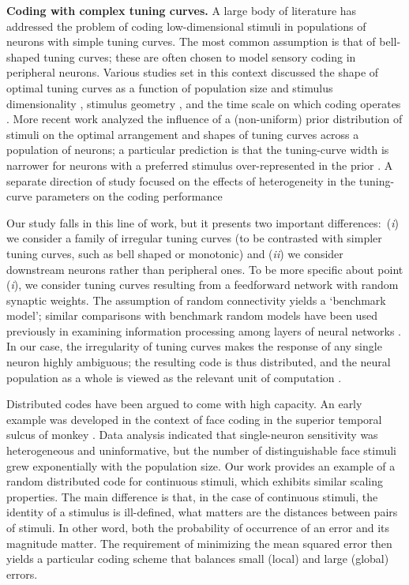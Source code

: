 \documentclass[a4paper]{article}%
\begin{document}
\textbf{Coding with complex tuning curves.} A large body of literature has
addressed the problem of coding low-dimensional stimuli in populations of
neurons with simple tuning curves. The most common assumption is that of
bell-shaped tuning curves; these are often chosen to model sensory coding in
peripheral neurons. Various studies set in this context discussed the shape of
optimal tuning curves as a function of population size and stimulus
dimensionality \cite[]{Zhang1999NeuronalBroaden}, stimulus geometry
\cite[]{Montemurro2006OptimalVariables}, and the time scale on which coding
operates \cite[]{Bethge2002OptimalFails,Yaeli2010Error-basedNeurons}. More
recent work analyzed the influence of a (non-uniform) prior distribution of
stimuli on the optimal arrangement and shapes of tuning curves across a
population of neurons; a particular prediction is that the tuning-curve width
is narrower for neurons with a preferred stimulus over-represented in the
prior
\cite[]{Wei2012EfficientInference,Ganguli2014EfficientPopulations,Yerxa2020EfficientStimuli}
. A separate direction of study focused on the effects of heterogeneity in the
tuning-curve parameters on the coding performance
\cite[]{Wilke2002RepresentationalPopulations,Shamir2006ImplicationsCoding,Fiscella2015VisualNeurons,Berry2019FunctionalCode}


Our study falls in this line of work, but it presents two important
differences:\ (\textit{i}) we consider a family of irregular tuning curves (to
be contrasted with simpler tuning curves, such as bell shaped or monotonic)
and (\textit{ii}) we consider downstream neurons rather than peripheral ones.
To be more specific about point (\textit{i}), we consider tuning curves
resulting from a feedforward network with random synaptic weights. The
assumption of random connectivity yields a `benchmark model'; similar
comparisons with benchmark random models have been used previously in
examining information processing among layers of neural networks
\cite[]{Barak2013TheTrade-off,Babadi2014SparsenessRepresentations,Litwin-Kumar2017OptimalConnectivity}. In our case, the irregularity of tuning curves makes the response of any
single neuron highly ambiguous; the resulting code is thus distributed, and
the neural population as a whole is viewed as the relevant unit of computation
\cite[]{Saxena2019TowardsDoctrine}.

Distributed codes have been argued to come with high capacity. An early
example was developed in the context of face coding in the superior temporal
sulcus of monkey \cite[]{Abbott1996RepresentationalMonkeys}. Data analysis
indicated that single-neuron sensitivity was heterogeneous and uninformative,
but the number of distinguishable face stimuli grew exponentially with the
population size. Our work provides an example of a random distributed code for
continuous stimuli, which exhibits similar scaling properties. The main
difference is that, in the case of continuous stimuli, the identity of a
stimulus is ill-defined, what matters are the distances between pairs of
stimuli. In other word, both the probability of occurrence of an error and its
magnitude matter. The requirement of minimizing the mean squared error then
yields a particular coding scheme that balances small (local) and large
(global) errors.
\end{document}
